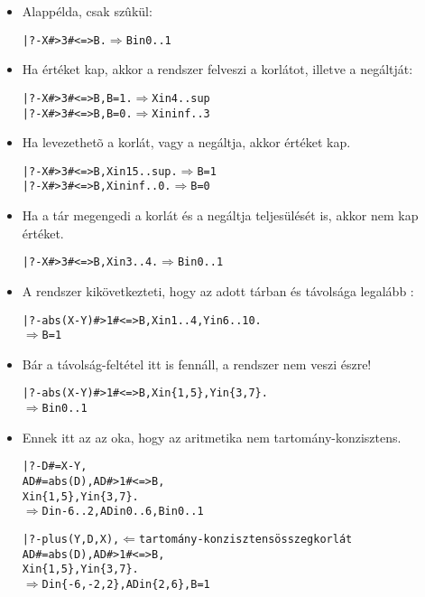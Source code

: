 \begin{itemize}
\item Alappélda, csak  szûkül:
\begin{alltt}
| ?- X#>3 #<=> B.                  \(\Rightarrow\) B in 0..1
\end{alltt}
\item Ha  értéket kap, akkor a rendszer felveszi a korlátot, illetve a negáltját:
\begin{alltt}
| ?- X#>3 #<=> B, B = 1.           \(\Rightarrow\) X in 4..sup
| ?- X#>3 #<=> B, B = 0.           \(\Rightarrow\) X in inf..3
\end{alltt}
\item Ha levezethetõ a korlát, vagy a negáltja, akkor  értéket kap.
\begin{alltt}
| ?- X#>3 #<=> B, X in 15..sup.    \(\Rightarrow\) B = 1
| ?- X#>3 #<=> B, X in inf..0.     \(\Rightarrow\) B = 0
\end{alltt}
\item Ha a tár megengedi a korlát és a negáltja teljesülését is, akkor  nem
kap értéket.
\begin{alltt}
| ?- X#>3 #<=> B, X in 3..4.       \(\Rightarrow\) B in 0..1
\end{alltt}
\item A rendszer kikövetkezteti, hogy az adott tárban  és  távolsága legalább :
\begin{alltt}
| ?- abs(X-Y)#>1 #<=> B, X in 1..4, Y in 6..10.
             \(\Rightarrow\) B = 1
\end{alltt}
\item Bár a távolság-feltétel itt is fennáll, a rendszer nem veszi észre!
\begin{alltt}
| ?- abs(X-Y)#>1 #<=> B, X in \{1,5\}, Y in \{3,7\}.
             \(\Rightarrow\) B in 0..1 
\end{alltt}
\item Ennek itt az az oka, hogy az aritmetika nem tartomány-konzisztens.
\begin{alltt}
| ?- D #= X-Y, 
     AD #= abs(D), AD#>1 #<=> B, 
     X in \{1,5\}, Y in \{3,7\}.
             \(\Rightarrow\) D in -6..2, AD in 0..6, B in 0..1
\end{alltt}
\begin{alltt}
| ?- plus(Y, D, X),      \(\Leftarrow\){\rm tartomány-konzisztens összegkorlát}
     AD #= abs(D), AD#>1 #<=> B, 
     X in \{1,5\}, Y in \{3,7\}.
             \(\Rightarrow\) D in \{-6,-2,2\}, AD in \{2,6\}, B = 1
\end{alltt}
\end{itemize}

